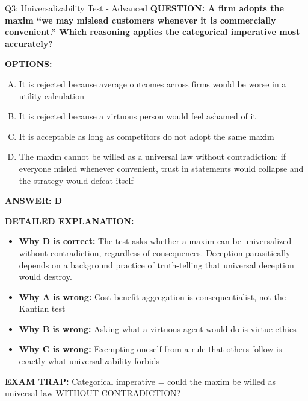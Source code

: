 \documentclass[8pt]{beamer}
\begin{document}
\begin{frame}[shrink=6]{Q3: Universalizability Test - Advanced}
\fontsize{6.5}{7.5}\selectfont
\textbf{QUESTION: A firm adopts the maxim ``we may mislead customers whenever it is commercially convenient.'' Which reasoning applies the categorical imperative most accurately?}

\vspace{0.1cm}
\textbf{OPTIONS:}
\begin{enumerate}[A.]
\item It is rejected because average outcomes across firms would be worse in a utility calculation
\item It is rejected because a virtuous person would feel ashamed of it
\item It is acceptable as long as competitors do not adopt the same maxim
\item The maxim cannot be willed as a universal law without contradiction: if everyone misled whenever convenient, trust in statements would collapse and the strategy would defeat itself
\end{enumerate}

\vspace{0.1cm}
\textcolor{myblue}{\textbf{ANSWER: D}}

\vspace{0.1cm}
\textbf{DETAILED EXPLANATION:}
\begin{itemize}
\item \textbf{Why D is correct:} The test asks whether a maxim can be universalized without contradiction, regardless of consequences. Deception parasitically depends on a background practice of truth-telling that universal deception would destroy.
\item \textbf{Why A is wrong:} Cost-benefit aggregation is consequentialist, not the Kantian test
\item \textbf{Why B is wrong:} Asking what a virtuous agent would do is virtue ethics
\item \textbf{Why C is wrong:} Exempting oneself from a rule that others follow is exactly what universalizability forbids
\end{itemize}

\textcolor{myred}{\textbf{EXAM TRAP:}} Categorical imperative = could the maxim be willed as universal law WITHOUT CONTRADICTION?
\end{frame}
\end{document}
